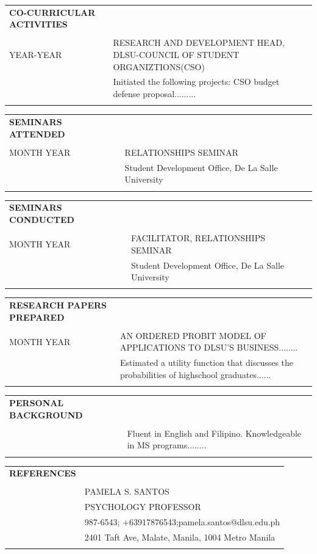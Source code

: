 \documentclass[11pt]{article}%
\begin{document}
\begin{tabu}{X[l] X[3l]}%
\textbf{CO{-}CURRICULAR ACTIVITIES}&\\%
&\\%
YEAR{-}YEAR&RESEARCH AND DEVELOPMENT HEAD, DLSU{-}COUNCIL OF STUDENT ORGANIZTIONS(CSO)\\%
&Initiated the following projects: CSO budget defense proposal.........\\%
&\\%
\end{tabu}%
\begin{tabu}{X[l] X[3l]}%
\textbf{SEMINARS ATTENDED}&\\%
&\\%
MONTH YEAR&RELATIONSHIPS SEMINAR\\%
&Student Development Office, De La Salle University\\%
&\\%
\end{tabu}%
\begin{tabu}{X[l] X[3l]}%
\textbf{SEMINARS CONDUCTED}&\\%
&\\%
MONTH YEAR&FACILITATOR, RELATIONSHIPS SEMINAR\\%
&Student Development Office, De La Salle University\\%
&\\%
\end{tabu}%
\begin{tabu}{X[l] X[3l]}%
\textbf{RESEARCH PAPERS PREPARED}&\\%
&\\%
MONTH YEAR&AN ORDERED PROBIT MODEL OF APPLICATIONS TO DLSU'S BUSINESS........\\%
&Estimated a utility function that discusses the probabilities of highschool graduates......\\%
&\\%
\end{tabu}%
\begin{tabu}{X[l] X[3l]}%
\textbf{PERSONAL BACKGROUND}&\\%
&\\%
&Fluent in English and Filipino. Knowledgeable in MS programs........\\%
&\\%
\end{tabu}%
\begin{tabu}{X[l] X[3l]}%
\textbf{REFERENCES}&\\%
&\\%
&PAMELA S. SANTOS\\%
&PSYCHOLOGY PROFESSOR\\%
&987{-}6543; +63917876543;pamela.santos@dlsu.edu.ph\\%
&2401 Taft Ave, Malate, Manila, 1004 Metro Manila\\%
&\\%
\end{tabu}%
\end{document}
